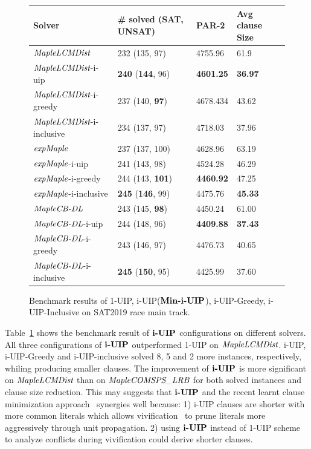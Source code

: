 \begin{figure} 
\begin{center}
\begin{tabular}{ | m{3.7cm} | m{4cm}| m{2cm} | m{2.75cm} |  } 
\hline
Solver & \# solved (SAT, UNSAT) & PAR-2 & Avg clause Size \\ 
\hline
$\textit{MapleLCMDist}$ & 232 (135, 97)  & 4755.96 & 61.9  \\ 
\hline
$\textit{MapleLCMDist}$-i-uip & \textbf{240} (\textbf{144}, 96) & \textbf{4601.25} & \textbf{36.97} \\ 
\hline
$\textit{MapleLCMDist}$-i-greedy & 237 (140, \textbf{97}) & 4678.434 & 43.62 \\ 
\hline
$\textit{MapleLCMDist}$-i-inclusive & 234 (137, 97) & 4718.03 & 37.96 \\ 
\hline
\hline
$\textit{expMaple}$ & 237 (137, 100)  & 4628.96 & 63.19 \\
\hline
$\textit{expMaple}$-i-uip & 241 (143, 98) & 4524.28 & 46.29 \\ 
\hline
$\textit{expMaple}$-i-greedy & 244 (143, \textbf{101}) & \textbf{4460.92} & 47.25 \\
\hline
$\textit{expMaple}$-i-inclusive & \textbf{245} (\textbf{146}, 99) & 4475.76 & \textbf{45.33} \\
\hline
\hline
$\textit{MapleCB-DL}$ & 243 (145, \textbf{98}) & 4450.24 & 61.00 \\
\hline
$\textit{MapleCB-DL}$-i-uip & 244 (148, 96) & \textbf{4409.88} & \textbf{37.43} \\
\hline
$\textit{MapleCB-DL}$-i-greedy & 243 (146, 97) & 4476.73 & 40.65 \\
\hline
$\textit{MapleCB-DL}$-i-inclusive & \textbf{245} (\textbf{150}, 95) & 4425.99 & 37.60 \\
\hline
\end{tabular}
\end{center}
\caption{Benchmark results of 1-UIP, i-UIP($\textbf{Min-i-UIP}$), i-UIP-Greedy,
i-UIP-Inclusive on SAT2019 race main track.}
\label{fig:t5}
\end{figure}

Table~\ref{fig:t5} shows the benchmark result of $\textbf{i-UIP}$ configurations on different solvers. All three configurations of $\textbf{i-UIP}$ outperformed 1-UIP on $\textit{MapleLCMDist}$. i-UIP, i-UIP-Greedy and i-UIP-inclusive solved 8, 5 and 2 more instances, respectively, whiling producing smaller clauses.  The improvement of $\textbf{i-UIP}$ is more significant on $\textit{MapleLCMDist}$ than on $\textit{MapleCOMSPS\_LRB}$ for both solved instances and clause size reduction. This may suggests that $\textbf{i-UIP}$ and the recent learnt clause minimization approach~\cite{} synergies well because: 1) i-UIP clauses are shorter with more common literals which allows vivification~\cite{} to prune literals more aggressively through unit propagation. 2) using $\textbf{i-UIP}$ instead of 1-UIP scheme to analyze conflicts during vivification could derive shorter clauses.

